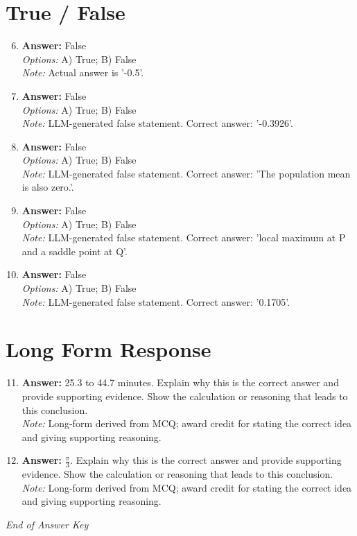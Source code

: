 \documentclass[12pt]{article}
\begin{document}
\section*{True / False}
\begin{enumerate}[label=\arabic*.]
\setcounter{enumi}{5}
\item \textbf{Answer:} False
\\ \textit{Options:} A) True; B) False
\\ \textit{Note:} Actual answer is '-0.5'.
\item \textbf{Answer:} False
\\ \textit{Options:} A) True; B) False
\\ \textit{Note:} LLM-generated false statement. Correct answer: '-0.3926'.
\item \textbf{Answer:} False
\\ \textit{Options:} A) True; B) False
\\ \textit{Note:} LLM-generated false statement. Correct answer: 'The population mean is also zero.'.
\item \textbf{Answer:} False
\\ \textit{Options:} A) True; B) False
\\ \textit{Note:} LLM-generated false statement. Correct answer: 'local maximum at P and a saddle point at Q'.
\item \textbf{Answer:} False
\\ \textit{Options:} A) True; B) False
\\ \textit{Note:} LLM-generated false statement. Correct answer: '0.1705'.
\end{enumerate}

\section*{Long Form Response}
\begin{enumerate}[label=\arabic*.]
\setcounter{enumi}{10}
\item \textbf{Answer:} 25.3 to 44.7 minutes. Explain why this is the correct answer and provide supporting evidence. Show the calculation or reasoning that leads to this conclusion.
\\ \textit{Note:} Long-form derived from MCQ; award credit for stating the correct idea and giving supporting reasoning.
\item \textbf{Answer:} \ensuremath{\frac{\pi}{3}}. Explain why this is the correct answer and provide supporting evidence. Show the calculation or reasoning that leads to this conclusion.
\\ \textit{Note:} Long-form derived from MCQ; award credit for stating the correct idea and giving supporting reasoning.
\end{enumerate}

\vfill
\noindent\textit{End of Answer Key}
\end{document}

